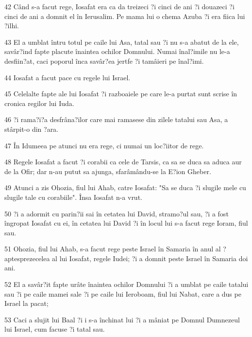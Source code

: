\par 42 Când s-a facut rege, Iosafat era ca da treizeci ?i cinci de ani ?i douazeci ?i cinci de ani a domnit el în Ierusalim. Pe mama lui o chema Azuba ?i era fiica lui ?ilhi.
\par 43 El a umblat întru totul pe caile lui Asa, tatal sau ?i nu s-a abatut de la ele, savâr?ind fapte placute înaintea ochilor Domnului. Numai înal?imile nu le-a desfiin?at, caci poporul înca savâr?ea jertfe ?i tamâieri pe înal?imi.
\par 44 Iosafat a facut pace cu regele lui Israel.
\par 45 Celelalte fapte ale lui Iosafat ?i razboaiele pe care le-a purtat sunt scrise în cronica regilor lui Iuda.
\par 46 ?i rama?i?a desfrâna?ilor care mai ramasese din zilele tatalui sau Asa, a stârpit-o din ?ara.
\par 47 În Idumeea pe atunci nu era rege, ci numai un loc?iitor de rege.
\par 48 Regele Iosafat a facut ?i corabii ca cele de Tarsis, ca sa se duca sa aduca aur de la Ofir; dar n-au putut sa ajunga, sfarâmându-se la E?ion Gheber.
\par 49 Atunci a zis Ohozia, fiul lui Ahab, catre Iosafat: "Sa se duca ?i slugile mele cu slugile tale cu corabiile". Însa Iosafat n-a vrut.
\par 50 ?i a adormit cu parin?ii sai în cetatea lui David, stramo?ul sau, ?i a fost îngropat Iosafat cu ei, în cetatea lui David ?i în locul lui s-a facut rege Ioram, fiul sau.
\par 51 Ohozia, fiul lui Ahab, s-a facut rege peste Israel în Samaria în anul al ?aptesprezecelea al lui Iosafat, regele Iudei; ?i a domnit peste Israel în Samaria doi ani.
\par 52 El a savâr?it fapte urâte înaintea ochilor Domnului ?i a umblat pe caile tatalui sau ?i pe caile mamei sale ?i pe caile lui Ieroboam, fiul lui Nabat, care a dus pe Israel la pacat;
\par 53 Caci a slujit lui Baal ?i i s-a închinat lui ?i a mâniat pe Domnul Dumnezeul lui Israel, cum facuse ?i tatal sau.


